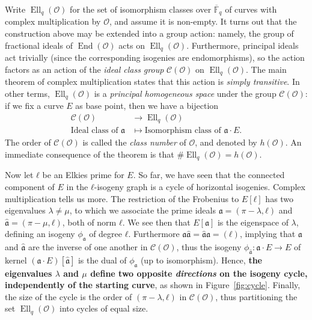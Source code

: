 \documentclass{llncs}
\newcommand{\Fbar}{\overline{\mathbb{F}}}
\newcommand{\Cl}{\mathcal{C}}
\renewcommand{\O}{\mathcal{O}}
\renewcommand{\frak}{\mathfrak}
\DeclareMathOperator{\End}{End}
\DeclareMathOperator{\Ell}{Ell}
\begin{document}
Write $\Ell_q(\O)$ for the set of isomorphism classes over $\Fbar_q$
of curves with complex multiplication by $\O$, and assume it is
non-empty. It turns out that the construction above may be extended
into a group action: namely, the group of fractional ideals of
$\End(\O)$ acts on $\Ell_q(\O)$. Furthermore, principal ideals act
trivially (since the corresponding isogenies are endomorphisms), 
so the action factors as an action of the \emph{ideal
  class group} $\Cl(\O)$ on $\Ell_q(\O)$.  The main theorem of complex
multiplication states that this action is \emph{simply transitive}. In
other terms, $\Ell_q(\O)$ is a \emph{principal homogeneous space}
under the group $\Cl(\O)$: if we fix a curve $E$ as base point,
then we have a bijection
\[
\begin{aligned}
\Cl(\O) &\longrightarrow \Ell_q(\O) \\
\text{Ideal class of }\frak a &\longmapsto \text{Isomorphism class of }\frak a\cdot E.
\end{aligned}
\]
The order of $\Cl(\O)$ is called the \emph{class number} of $\O$, and
denoted by $h(\O)$. An immediate consequence of the theorem is that
$\#\Ell_q(\O)=h(\O)$.

Now let $ℓ$ be an Elkies prime for $E$. So far, we have seen that the
connected component of $E$ in the $ℓ$-isogeny graph is a cycle of
horizontal isogenies. Complex multiplication tells us more. The
restriction of the Frobenius to $E[ℓ]$ has two eigenvalues $λ≠μ$, to
which we associate the prime ideals $\frak a=(π-λ,ℓ)$ and
$\hat{\frak a}=(π-μ,ℓ)$, both of norm $ℓ$. We see then that
$E[\frak a]$ is the eigenspace of $λ$, defining an isogeny
$ϕ_{\frak{a}}$ of degree $ℓ$. Furthermore
$\frak a\hat{\frak a} = \hat{\frak a}\frak a = (ℓ)$, implying that
$\frak a$ and $\hat{\frak a}$ are the inverse of one another in
$\Cl(\O)$, thus the isogeny $ϕ_{\hat{\frak a}}:\frak a·E→E$ of
kernel $(\frak a·E)[\hat{\frak a}]$ is the dual of $ϕ_{\frak a}$ (up
to isomorphism). Hence, 
\textbf{the eigenvalues $λ$ and $μ$ define two opposite
  \emph{directions} on the isogeny cycle, independently of the
  starting curve}, as shown in Figure~\ref{fig:cycle}.  Finally, the
size of the cycle is the order of $(π-λ,ℓ)$ in $\Cl(\O)$, thus
partitioning the set $\Ell_q(\O)$ into cycles of equal size.
\end{document}
